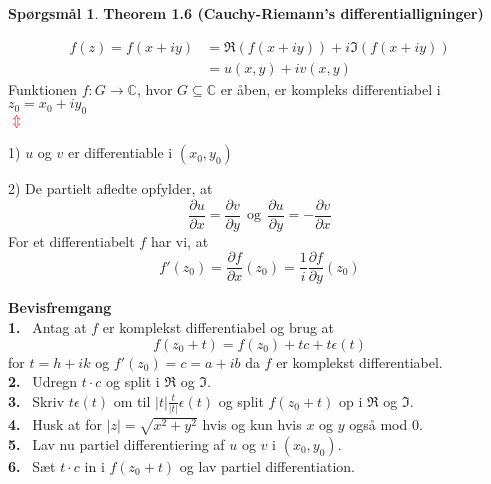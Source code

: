 \documentclass[10pt,a4paper]{article}
\theoremstyle{definition}
\newtheorem{Prob}{Spørgsmål}
\begin{document}
\begin{Prob}{\textbf{Theorem 1.6 (Cauchy-Riemann's differentialligninger)}}

\begin{align*}
f(z) = f(x+iy) &= \Re(f(x+iy)) + i \Im(f(x+iy))  \\
&= u(x,y) + i v(x,y)
\end{align*}
Funktionen $f: G \rightarrow \mathbb{C}$, hvor $G \subseteq \mathbb{C}$ er åben, er kompleks differentiabel i $z_0 = x_0 +i y_0$ \\
\textcolor{red}{$\Updownarrow$}
\item[1)] $u$ og $v$ er differentiable i $(x_0,y_0)$
\item[2)] De partielt afledte opfylder, at
$$ \frac{\partial u}{\partial x} = \frac{\partial v}{\partial y}  \ \ \text{og} \ \ \frac{\partial u}{\partial y} = - \frac{\partial v}{\partial x} $$ 
For et differentiabelt $f$ har vi, at
$$ f' (z_0) = \frac{\partial f}{\partial x} (z_0) = \frac{1}{i} \frac{\partial f}{\partial y} (z_0)$$
\end{Prob}

\begin{framed}
\textbf{Bevisfremgang} \\
\textbf{1.} \ Antag at $f$ er komplekst differentiabel og brug at 
$$ f (z_0 + t) = f(z_0) + tc + t \epsilon (t)$$
for $t=h+ik$ og $f'(z_0)=c=a+ib$ da $f$ er komplekst differentiabel. \\
\textbf{2.} \ Udregn $ t \cdot c$ og split i $\Re$ og $\Im$. \\
\textbf{3.} \ Skriv $t\epsilon(t)$ om til $|t|\frac{t}{|t|}\epsilon(t)$ og split $f(z_0 + t)$ op i $\Re$ og $\Im$. \\
\textbf{4.} \ Husk at for $|z| = \sqrt{x^2+y^2}$ hvis og kun hvis $x$ og $y$ også mod $0$. \\
\textbf{5.} \  Lav nu partiel differentiering af $u$ og $v$ i $(x_0,y_0)$. \\
\textbf{6.} \ Sæt $t\cdot c$ in i $f(z_0 + t)$ og lav partiel differentiation.
\end{framed}
\end{document}
